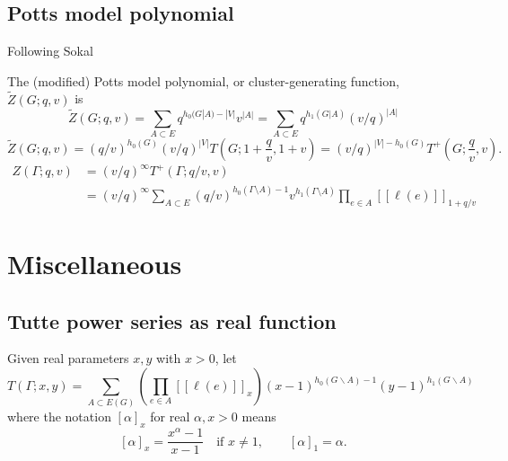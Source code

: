 \documentclass{amsart}
\theoremstyle{definition}
\newcommand{\RR}{\mathbb{R}}
\newcommand{\fanalog}[2]{[\![#2]\!]_{#1}}
\newcommand{\analog}[2]{[#2]_{#1}}
\begin{document}
\subsection{Potts model polynomial}

Following Sokal~\cite[Section 2.5]{Sok-potts}

The (modified) Potts model polynomial, or cluster-generating function, $\widetilde Z(G; q,v)$ is
\[
	\widetilde Z(G; q, v) = \sum_{A \subset E} q^{h_0(G|A) - |V|} v^{|A|}
	= \sum_{A \subset E} q^{h_1(G|A)} (v/q)^{|A|}
\]
\[
	\widetilde Z(G; q,v) = (q/v)^{h_0(G)} (v/q)^{|V|} T(G; 1 + \frac{q}{v}, 1 + v) 
	= (v/q)^{|V| - h_0(G)} T^+(G; \frac{q}{v}, v) .
\]
\begin{align*}
	Z(\Gamma; q, v) &= (v/q)^{\infty} T^+(\Gamma; q/v, v) \\
	&= (v/q)^{\infty} \sum_{A \subset E} (q/v)^{h_0(\Gamma \setminus A) - 1} v^{h_1(\Gamma \setminus A)} \prod_{e \in A} \fanalog{1 + q/v}{\ell(e)}
\end{align*}

\section{Miscellaneous}

\subsection{Tutte power series as real function}
Given real parameters $x,y$ with $x > 0$,
let 
\begin{equation}
\label{eq:tutte-metric-graph}
	T(\Gamma; x,y) = \sum_{A \subset E(G)} \left( \prod_{e \in A} \fanalog{x}{\ell(e)} \right)
	(x-1)^{h_0(G\backslash A) - 1}(y-1)^{h_1(G\backslash A)}
\end{equation}
where the notation $\analog{x}{\alpha}$ for real $\alpha, x > 0$ means
\begin{equation*}
\label{eq:q-analog-real}
	\analog{x}{\alpha} = \frac{x^\alpha - 1}{x-1}
	\quad\text{if } x \neq 1,
	\qquad 
	\analog{1}{\alpha} = \alpha.
\end{equation*}

\end{document}
